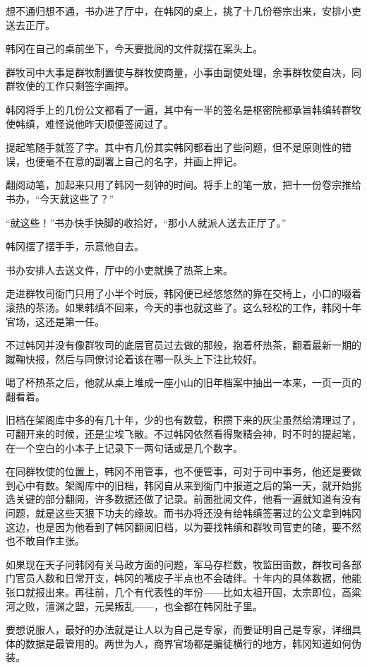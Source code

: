 想不通归想不通，书办进了厅中，在韩冈的桌上，挑了十几份卷宗出来，安排小吏送去正厅。

韩冈在自己的桌前坐下，今天要批阅的文件就摆在案头上。

群牧司中大事是群牧制置使与群牧使商量，小事由副使处理，余事群牧使自决，同群牧使的工作只剩签字画押。

韩冈将手上的几份公文都看了一遍，其中有一半的签名是枢密院都承旨韩缜转群牧使韩缜，难怪说他昨天顺便签阅过了。

提起笔随手就签了字。其中有几份其实韩冈都看出了些问题，但不是原则性的错误，也便毫不在意的副署上自己的名字，并画上押记。

翻阅动笔，加起来只用了韩冈一刻钟的时间。将手上的笔一放，把十一份卷宗推给书办，“今天就这些了？”

“就这些！”书办快手快脚的收拾好，“那小人就派人送去正厅了。”

韩冈摆了摆手手，示意他自去。

书办安排人去送文件，厅中的小吏就换了热茶上来。

走进群牧司衙门只用了小半个时辰，韩冈便已经悠悠然的靠在交椅上，小口的啜着滚热的茶汤。如果韩缜不回来，今天的事也就这些了。这么轻松的工作，韩冈十年官场，这还是第一任。

不过韩冈并没有像群牧司的底层官员过去做的那般，抱着杯热茶，翻着最新一期的蹴鞠快报，然后与同僚讨论着该在哪一队头上下注比较好。

喝了杯热茶之后，他就从桌上堆成一座小山的旧年档案中抽出一本来，一页一页的翻看着。

旧档在架阁库中多的有几十年，少的也有数载，积攒下来的灰尘虽然给清理过了，可翻开来的时候，还是尘埃飞散。不过韩冈依然看得聚精会神，时不时的提起笔，在一个空白的小本子上记录下一两句话或是几个数字。

在同群牧使的位置上，韩冈不用管事，也不便管事，可对于司中事务，他还是要做到心中有数。架阁库中的旧档，韩冈自从来到衙门中报道之后的第一天，就开始挑选关键的部分翻阅，许多数据还做了记录。前面批阅文件，他看一遍就知道有没有问题，就是这些天狠下功夫的缘故。而书办将还没有给韩缜签署过的公文拿到韩冈这边，也是因为他看到了韩冈翻阅旧档，以为要找韩缜和群牧司官吏的碴，要不然也不敢自作主张。

如果现在天子问韩冈有关马政方面的问题，军马存栏数，牧监田亩数，群牧司各部门官员人数和日常开支，韩冈的嘴皮子半点也不会磕绊。十年内的具体数据，他能张口就报出来。再往前，几个有代表性的年份——比如太祖开国，太宗即位，高粱河之败，澶渊之盟，元昊叛乱——，也全都在韩冈肚子里。

要想说服人，最好的办法就是让人以为自己是专家，而要证明自己是专家，详细具体的数据是最管用的。两世为人，商界官场都是骗徒横行的地方，韩冈知道如何伪装。

